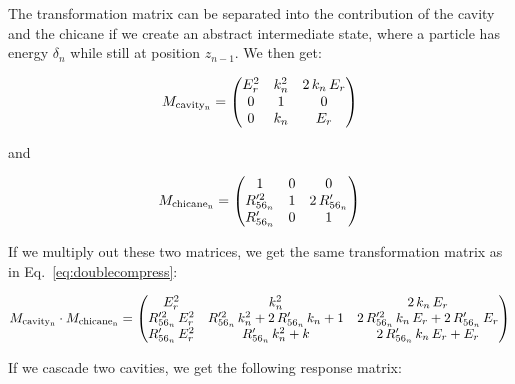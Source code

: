 \documentclass[a4paper,12pt]{article}
\begin{document}
\noindent The transformation matrix can be separated into the contribution of the cavity and the chicane if we create an abstract intermediate state, where a particle has energy $\delta_n$ while still at position $z_{n-1}$. We then get:

\begin{equation}
M_{\rm cavity_n}=
  \begin{pmatrix}
    E_{r}^2 & k_n^2 & 2\,k_n\,E_{r} \\
    0 & 1 & 0 \\
    0 & k_n & E_{r} \\
  \end{pmatrix}
\end{equation}

\noindent and

\begin{equation}
M_{\rm chicane_n}=
  \begin{pmatrix}
    1 & 0 & 0 \\
    R'^2_{56_n} & 1 & 2\,R'_{56_n}\\
    R'_{56_n} & 0 & 1 \\
  \end{pmatrix}
\end{equation}

\noindent If we multiply out these two matrices, we get the same transformation matrix as in Eq.~\ref{eq:doublecompress}:

\begin{equation}
M_{\rm cavity_n}\cdot M_{\rm chicane_n}=
  \begin{pmatrix}
    E_{r}^2 & k^2_n & 2\,k_n\,E_{r} \\
    R'^2_{56_n}\,E_{r}^2 & R'^2_{56_n}\,k^2_n+2\,R'_{56_n}\,k_n+1 & 2\,R'^2_{56_n}\,k_n\,E_{r}+2\,R'_{56_n}\,E_{r}\\
    R'_{56_n}\,E_{r}^2 & R'_{56_n}\,k^2_n+k & 2\,R'_{56_n}\,k_n\,E_{r}+E_{r}
  \end{pmatrix}
\end{equation}

If we cascade two cavities, we get the following response matrix:
\end{document}

